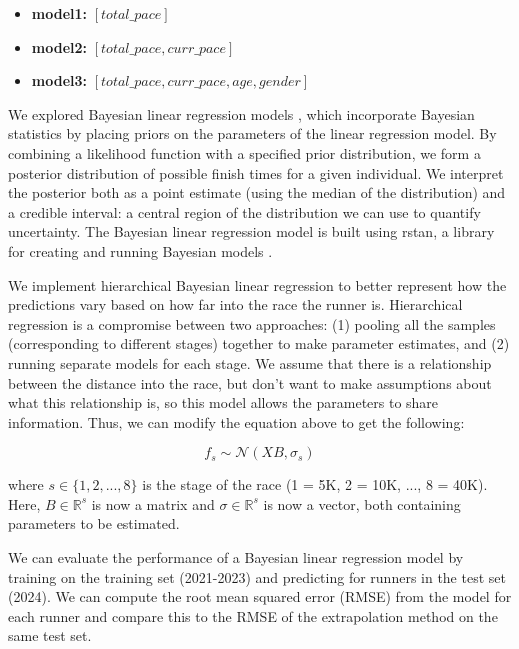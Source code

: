 \documentclass[USenglish,twocolumn]{article}
\theoremstyle{dgthm}
\theoremstyle{dgdef}
\begin{document}
\begin{itemize}
    \item \textbf{model1:} $[total\_pace ]$
    \item \textbf{model2:} $[total\_pace, curr\_pace ]$
    \item \textbf{model3:} $[total\_pace, curr\_pace, age, gender]$
\end{itemize}


We explored Bayesian linear regression models \cite{gelman:1995}, which incorporate Bayesian statistics by placing priors on the parameters of the linear regression model. By combining a likelihood function with a specified prior distribution, we form a posterior distribution of possible finish times for a given individual. We interpret the posterior both as a point estimate (using the median of the distribution) and a credible interval: a central region of the distribution we can use to quantify uncertainty. The Bayesian linear regression model is built using rstan, a library for creating and running Bayesian models \cite{stan:2024}.

We implement hierarchical Bayesian linear regression to better represent how the predictions vary based on how far into the race the runner is. Hierarchical regression is a compromise between two approaches: (1) pooling all the samples (corresponding to different stages) together to make parameter estimates, and (2) running separate models for each stage. We assume that there is a relationship between the distance into the race, but don't want to make assumptions about what this relationship is, so this model allows the parameters to share information. Thus, we can modify the equation above to get the following:

\begin{equation}
f_{s} \sim  \mathcal{N}(XB, \sigma_{s})
\label{eq:2}
\end{equation} 

where $s \in \{1, 2, ..., 8\}$ is the stage of the race (1 = 5K, 2 = 10K, ..., 8 = 40K). Here, $B \in \mathbb{R}^{s}$ is now a matrix and $\sigma \in \mathbb{R}^{s}$ is now a vector, both containing parameters to be estimated.

We can evaluate the performance of a Bayesian linear regression model by training on the training set (2021-2023) and predicting for runners in the test set (2024). We can compute the root mean squared error (RMSE) from the model for each runner and compare this to the RMSE of the extrapolation method on the same test set.
\end{document}
